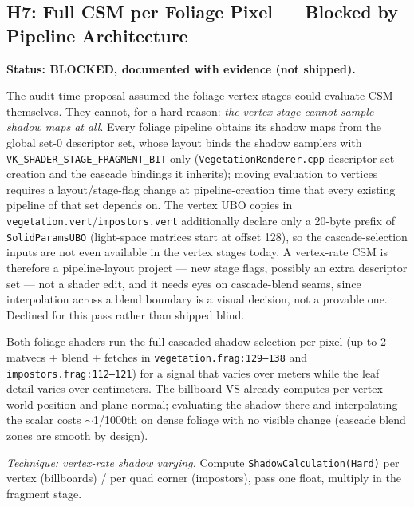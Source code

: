 \documentclass[11pt,a4paper]{article}
\begin{document}
\subsection{H7: Full CSM per Foliage Pixel --- Blocked by Pipeline Architecture}
\label{sec:h7}

\textbf{Status: BLOCKED, documented with evidence (not shipped).}

The audit-time proposal assumed the foliage vertex stages could evaluate CSM
themselves. They cannot, for a hard reason: \emph{the vertex stage cannot
sample shadow maps at all}. Every foliage pipeline obtains its shadow maps
from the global set-0 descriptor set, whose layout binds the shadow samplers
with \texttt{VK\_SHADER\_STAGE\_FRAGMENT\_BIT} only
(\texttt{VegetationRenderer.cpp} descriptor-set creation and the cascade
bindings it inherits); moving evaluation to vertices requires a
layout/stage-flag change at pipeline-creation time that every existing
pipeline of that set depends on. The vertex UBO copies in
\texttt{vegetation.vert}/\texttt{impostors.vert} additionally declare only a
20-byte prefix of \texttt{SolidParamsUBO} (light-space matrices start at
offset 128), so the cascade-selection inputs are not even available in the
vertex stages today. A vertex-rate CSM is therefore a pipeline-layout
project --- new stage flags, possibly an extra descriptor set --- not a
shader edit, and it needs eyes on cascade-blend seams, since interpolation
across a blend boundary is a visual decision, not a provable one. Declined
for this pass rather than shipped blind.

Both foliage shaders run the full cascaded shadow selection per pixel (up
to 2 matvecs + blend + fetches in \texttt{vegetation.frag:129--138} and
\texttt{impostors.frag:112--121}) for a signal that varies over meters
while the leaf detail varies over centimeters. The billboard VS already
computes per-vertex world position and plane normal; evaluating the shadow
there and interpolating the scalar costs $\sim$1/1000th on dense foliage
with no visible change (cascade blend zones are smooth by design).

\textit{Technique: vertex-rate shadow varying.} Compute
\texttt{ShadowCalculation(Hard)} per vertex (billboards) / per quad corner
(impostors), pass one float, multiply in the fragment stage.
\end{document}
